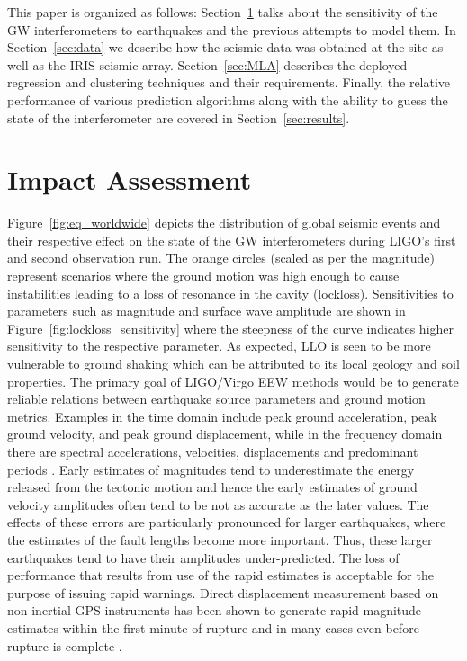 \documentclass[twocolumn, aps, superscriptaddress]{revtex4}
\begin{document}
This paper is organized as follows: Section~\ref{sec:motivation} talks about the sensitivity of the GW interferometers to earthquakes and the previous attempts to model them. In Section~\ref{sec:data} we describe how the seismic data was obtained at the site as well as the IRIS seismic array. Section~\ref{sec:MLA} describes the deployed regression and clustering techniques and their requirements. Finally, the relative performance of various prediction algorithms along with the ability to guess the state of the interferometer are covered in Section~\ref{sec:results}.

\section{Impact Assessment}\label{sec:motivation}
Figure~\ref{fig:eq_worldwide} depicts the distribution of global seismic events and their respective effect on the state of the GW interferometers during LIGO's first and second observation run. The orange circles (scaled as per the magnitude) represent scenarios where the ground motion was high enough to cause instabilities leading to a loss of resonance in the cavity (lockloss). Sensitivities to parameters such as magnitude and surface wave amplitude are shown in Figure~\ref{fig:lockloss_sensitivity} where the steepness of the curve indicates higher sensitivity to the respective parameter. As expected, LLO is seen to be more vulnerable to ground shaking which can be attributed to its local geology and soil properties\cite{Daw2004}. The primary goal of LIGO/Virgo EEW methods would be to generate reliable relations between earthquake source parameters and ground motion metrics. Examples in the time domain include peak ground acceleration, peak ground velocity, and peak
ground displacement, while in the frequency domain there are spectral accelerations, velocities, displacements and predominant periods \cite{Do2003}.  Early estimates of magnitudes tend to underestimate the energy released from the tectonic motion and hence the early estimates of ground velocity amplitudes often tend to be not as accurate as the later values. The effects of these errors are particularly pronounced for larger earthquakes, where the estimates of the fault lengths become more important.
Thus, these larger earthquakes tend to have their amplitudes under-predicted.
The loss of performance that results from use of the rapid estimates is acceptable for the purpose of issuing rapid warnings. Direct displacement measurement based on non-inertial GPS instruments has been shown to generate rapid magnitude estimates within the first minute of rupture and in many cases even before rupture is complete \cite{MeCr2015}.
\end{document}
